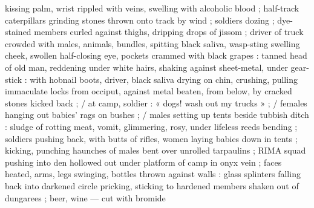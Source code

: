 kissing palm, wrist rippled with veins, swelling with alcoholic blood ;
half-track caterpillars grinding stones thrown onto track by wind ;
soldiers dozing ; dye-stained members curled against thighs,
dripping drops of jissom ; driver of truck crowded with males,
animals, bundles, spitting black saliva, wasp-sting swelling cheek,
swollen half-closing eye, pockets crammed with black grapes :
tanned head of old man, reddening under white hairs, shaking
against sheet-metal, under gear-stick : with hobnail boots, driver,
black saliva drying on chin, crushing, pulling immaculate locks from
occiput, against metal beaten, from below, by cracked stones kicked
back ; / at camp, soldier : « dogs! wash out my trucks » ; / females
hanging out babies’ rags on bushes ; / males setting up tents beside
tubbish ditch : sludge of rotting meat, vomit, glimmering, rosy, under
lifeless reeds bending ; soldiers pushing back, with butts of rifles,
women laying babies down in tents ; kicking, punching haunches of
males bent over unrolled tarpaulins ; RIMA squad pushing into den
hollowed out under platform of camp in onyx vein ; faces heated,
arms, legs swinging, bottles thrown against walls : glass splinters
falling back into darkened circle pricking, sticking to hardened
members shaken out of dungarees ; beer, wine — cut with bromide

